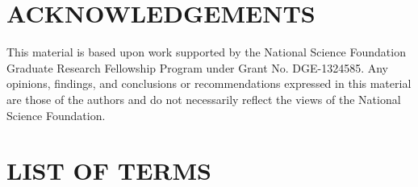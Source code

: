 \documentclass{bmd2016p}
\begin{document}
\section*{ACKNOWLEDGEMENTS}
This material is based upon work supported by the National Science Foundation Graduate Research Fellowship Program under Grant No. DGE-1324585. Any opinions, findings, and conclusions or recommendations expressed in this material are those of the authors and do not necessarily reflect the views of the National Science Foundation.


\normalem




\newpage
\section*{LIST OF TERMS}
\end{document}
